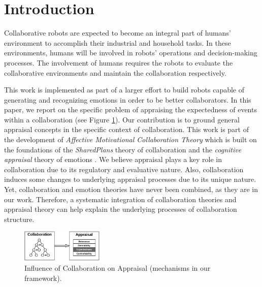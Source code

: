 \documentclass{aamas2016_extendedabstract}
\begin{document}

\section{Introduction}

Collaborative robots are expected to become an integral part of humans'
environment to accomplish their industrial and household tasks. In these
environments, humans will be involved in robots' operations and decision-making
processes. The involvement of humans requires the robots to evaluate the
collaborative environments and maintain the collaboration respectively.

This work is implemented as part of a larger effort to build robots capable of
generating and recognizing emotions in order to be better collaborators. In this
paper, we report on the specific problem of appraising the expectedness of
events within a collaboration (see Figure \ref{fig:cpm}). Our contribution is to
ground general appraisal concepts in the specific context of collaboration. This
work is part of the development of \textit{Affective Motivational Collaboration
Theory} \cite{shayganfar:theory-overview} which is built on the foundations of
the \textit{SharedPlans} theory of collaboration \cite{grosz:plans-discourse}
and the \textit{cognitive appraisal} theory of emotions
\cite{gratch:domain-independent}. We believe appraisal plays a key role in
collaboration due to its regulatory and evaluative nature. Also, collaboration
induces some changes to underlying appraisal processes due to its unique nature.
Yet, collaboration and emotion theories have never been combined, as they are in
our work. Therefore, a systematic integration of collaboration theories and
appraisal theory can help explain the underlying processes of collaboration
structure.

\begin{figure}[t]
  \centering
  \includegraphics[width=0.35\textwidth]{figure/actionselection-croped.pdf}
  \vspace*{-3mm}
  \caption{{\fontsize{8}{9}\selectfont Influence of Collaboration on Appraisal
  (mechanisms in our framework).}}
  \label{fig:cpm}
  \vspace*{-5mm}
\end{figure}
\end{document}
